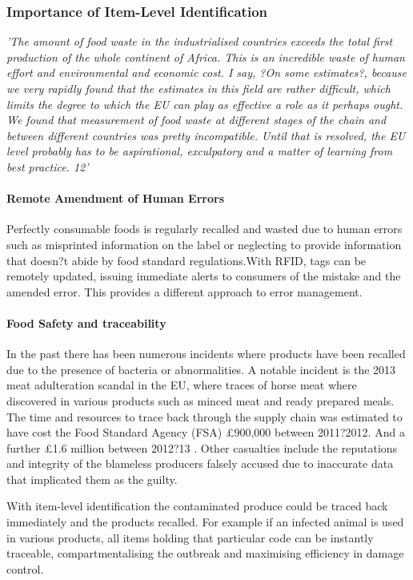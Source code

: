 \documentclass[a4paper, 11pt]{article}
\begin{document}
\subsubsection{Importance of Item-Level Identification}
\emph{'The amount of food waste in the industrialised countries exceeds the total first
production of the whole continent of Africa. This is an incredible waste of human effort
and environmental and economic cost. I say, ?On some estimates?, because we very
rapidly found that the estimates in this field are rather difficult, which limits the degree
to which the EU can play as effective a role as it perhaps ought. We found that
measurement of food waste at different stages of the chain and between different
countries was pretty incompatible. Until that is resolved, the EU level probably has to
be aspirational, exculpatory and a matter of learning from best practice. 12'}

\paragraph{Remote Amendment of Human Errors}
Perfectly consumable foods is regularly recalled and wasted due to human errors such as misprinted information on the label or neglecting to provide information that doesn?t abide by food standard regulations.With RFID, tags can be remotely updated, issuing immediate alerts to consumers of the mistake and the amended error. This provides a different approach to error management.

\paragraph{Food Safety and traceability}
In the past there has been numerous incidents where products have been recalled due to the presence of bacteria or abnormalities. A notable incident is the 2013 meat adulteration scandal in the EU, where traces of horse meat where discovered in various products such as minced meat and ready prepared meals. The time and resources to trace back through the supply chain was estimated to have cost the Food Standard Agency (FSA) \pounds900,000 between 2011?2012. And a further \pounds1.6 million between 2012?13 \cite{3}. Other casualties include the reputations and integrity of the blameless producers falsely accused due to inaccurate data that implicated them as the guilty. 

With item-level identification the contaminated produce could be traced back immediately and the products recalled. For example if an infected animal is used in various products, all items holding that particular code can be instantly traceable, compartmentalising the outbreak and maximising efficiency in damage control. 
\end{document}
